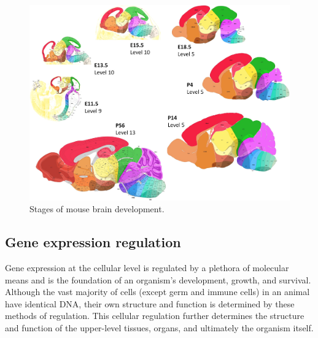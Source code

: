 \documentclass[12pt,oneside,onecolumn,a4paper]{article}
\begin{document}
\begin{figure}[h!]
\begin{center}
\includegraphics[width=0.8\columnwidth]{figures/160913_thompson_atlas/160913_thompson_atlas}
\caption{Stages of mouse brain development. \citep{Thompson_2014}%
}
\end{center}
\end{figure}

\subsection{Gene expression regulation}
Gene expression at the cellular level is regulated by a plethora of molecular means and is the foundation of an organism's development, growth, and survival. Although the vast majority of cells (except germ and immune cells) in an animal have identical DNA, their own structure and function is determined by these methods of regulation. This cellular regulation further determines the structure and function of the upper-level tissues, organs, and ultimately the organism itself. 
\end{document}
